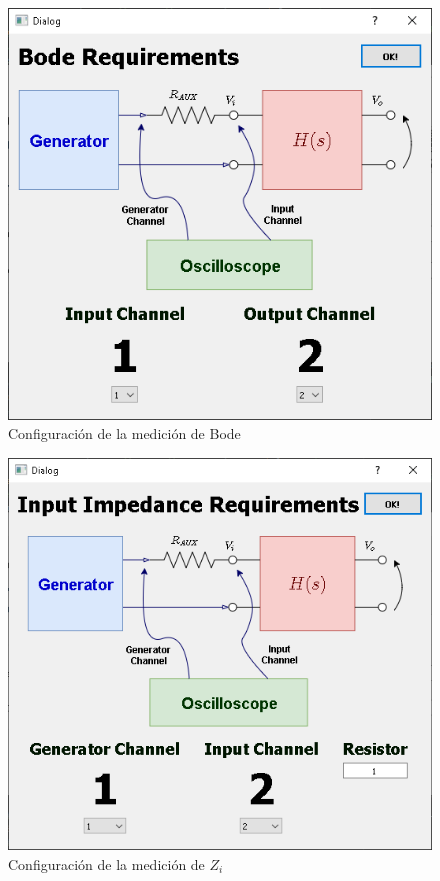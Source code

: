 \begin{figure}[H]
    \centering
        \includegraphics[scale=0.9]{../screenshots/bode_run.PNG}
    \caption{Configuraci\'on de la medici\'on de Bode}
\end{figure}

\begin{figure}[H]
    \centering
        \includegraphics[scale=0.9]{../screenshots/impedance_run.PNG}
    \caption{Configuraci\'on de la medici\'on de $Z_i$}
\end{figure}

